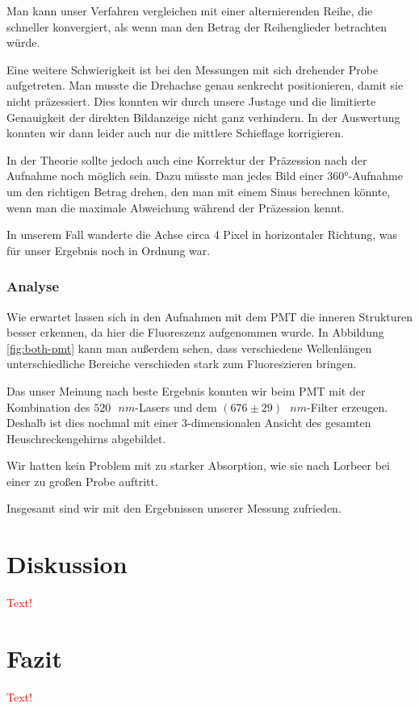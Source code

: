 Man kann unser Verfahren vergleichen mit einer alternierenden Reihe, die schneller konvergiert, als wenn man den Betrag der Reihenglieder betrachten würde.

Eine weitere Schwierigkeit ist bei den Messungen mit sich drehender Probe aufgetreten.
Man musste die Drehachse genau senkrecht positionieren, damit sie nicht präzessiert.
Dies konnten wir durch unsere Justage und die limitierte Genauigkeit der direkten Bildanzeige nicht ganz verhindern.
In der Auswertung konnten wir dann leider auch nur die mittlere Schieflage korrigieren.

In der Theorie sollte jedoch auch eine Korrektur der Präzession nach der Aufnahme noch möglich sein.
Dazu müsste man jedes Bild einer 360°-Aufnahme um den richtigen Betrag drehen, den man mit einem Sinus berechnen könnte, wenn man die maximale Abweichung während der Präzession kennt.

In unserem Fall wanderte die Achse circa 4 Pixel in horizontaler Richtung, was für unser Ergebnis noch in Ordnung war.

\subsubsection{Analyse}
Wie erwartet lassen sich in den Aufnahmen mit dem PMT die inneren Strukturen besser erkennen, da hier die Fluoreszenz aufgenommen wurde.
In Abbildung \ref{fig:both-pmt} kann man außerdem sehen, dass verschiedene Wellenlängen unterschiedliche Bereiche verschieden stark zum Fluoreszieren bringen.

Das unser Meinung nach beste Ergebnis konnten wir beim PMT mit der Kombination des $520\text{ } \si{nm}$-Lasers und dem $(676 \pm 29)\text{ } \si{nm}$-Filter erzeugen.
Deshalb ist dies nochmal mit einer 3-dimensionalen Ansicht des gesamten Heuschreckengehirns abgebildet.

Wir hatten kein Problem mit zu starker Absorption, wie sie nach Lorbeer \cite{slot_paper} bei einer zu großen Probe auftritt.

Insgesamt sind wir mit den Ergebnissen unserer Messung zufrieden.

\section{Diskussion}
\textcolor{red}{Text!}

\section{Fazit}
\textcolor{red}{Text!}

